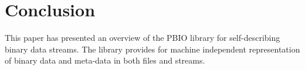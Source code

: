 \documentclass{article}
\begin{document}
\section{Conclusion}
This paper has presented an overview of the PBIO library for self-describing
binary data streams.  The library provides for machine independent
representation of binary data and meta-\linebreak[0]data in both files and streams.
%

\end{document}
